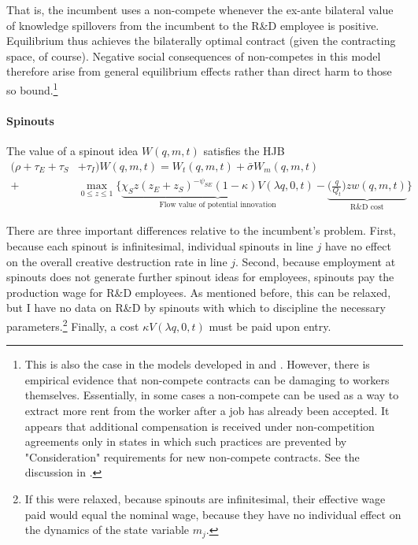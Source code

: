 \documentclass[12pt,english]{article}
\theoremstyle{remark}
\begin{document}
That is, the incumbent uses a non-compete whenever the ex-ante bilateral value of knowledge spillovers from the incumbent to the R\&D employee is positive. Equilibrium thus achieves the bilaterally optimal contract (given the contracting space, of course). Negative social consequences of non-competes in this model therefore arise from general equilibrium effects rather than direct harm to those so bound.\footnote{This is also the case in the models developed in \cite{baslandze_spinout_2019} and \cite{shi_restrictions_2018}. However, there is empirical evidence that non-compete contracts can be damaging to workers themselves. Essentially, in some cases a non-compete can be used as a way to extract more rent from the worker after a job has already been accepted. It appears that additional compensation is received under non-competition agreements only in states in which such practices are prevented by "Consideration" requirements for new non-compete contracts. See the discussion in \cite{starr_consider_2018}.}

\paragraph{Spinouts}

The value of a spinout idea $W(q,m,t)$ satisfies the HJB
\begin{align}
	(\rho  + \tau_E + \tau_S& + \tau_I)W(q,m,t) = W_t(q,m,t) + \bar{\sigma}W_m(q,m,t) \nonumber \\
	+& \max_{0 \le z \le 1} \Big\{ \underbrace{\chi_S z (z_E + z_S)^{-\psi_{SE}} (1-\kappa) V(\lambda q,0,t)}_{\textrm{Flow value of potential innovation}} - \underbrace{\Big(\frac{q}{Q_t}\Big) z w(q,m,t)}_{\textrm{R\&D cost}} \Big\} \label{HJB_S}
\end{align}

There are three important differences relative to the incumbent's problem. First, because each spinout is infinitesimal, individual spinouts in line $j$ have no effect on the overall creative destruction rate in line $j$. Second, because employment at spinouts does not generate further spinout ideas for employees, spinouts pay the production wage for R\&D employees. As mentioned before, this can be relaxed, but I have no data on R\&D by spinouts with which to discipline the necessary parameters.\footnote{If this were relaxed, because spinouts are infinitesimal, their effective wage paid would equal the nominal wage, because they have no individual effect on the dynamics of the state variable $m_j$.} Finally, a cost $\kappa V(\lambda q, 0, t)$ must be paid upon entry. 
\end{document}
